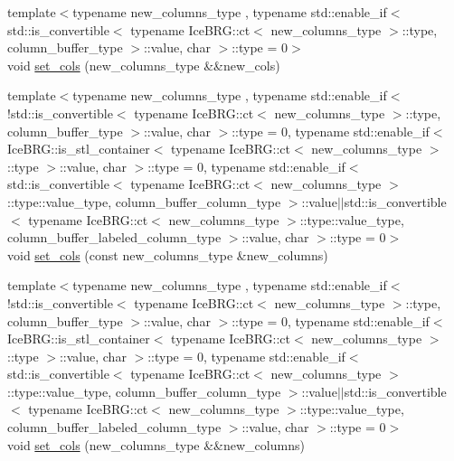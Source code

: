 \begin{DoxyCompactItemize}
{\footnotesize template$<$typename new\+\_\+columns\+\_\+type , typename std\+::enable\+\_\+if$<$ std\+::is\+\_\+convertible$<$ typename Ice\+B\+R\+G\+::ct$<$ new\+\_\+columns\+\_\+type $>$\+::type, column\+\_\+buffer\+\_\+type $>$\+::value, char $>$\+::type  = 0$>$ }\\void \hyperlink{classIceBRG_1_1labeled__array_af78a2d14599513072cffe0a4807bfc65}{set\+\_\+cols} (new\+\_\+columns\+\_\+type \&\&new\+\_\+cols)
\item 
{\footnotesize template$<$typename new\+\_\+columns\+\_\+type , typename std\+::enable\+\_\+if$<$!std\+::is\+\_\+convertible$<$ typename Ice\+B\+R\+G\+::ct$<$ new\+\_\+columns\+\_\+type $>$\+::type, column\+\_\+buffer\+\_\+type $>$\+::value, char $>$\+::type  = 0, typename std\+::enable\+\_\+if$<$ Ice\+B\+R\+G\+::is\+\_\+stl\+\_\+container$<$ typename Ice\+B\+R\+G\+::ct$<$ new\+\_\+columns\+\_\+type $>$\+::type $>$\+::value, char $>$\+::type  = 0, typename std\+::enable\+\_\+if$<$ std\+::is\+\_\+convertible$<$ typename Ice\+B\+R\+G\+::ct$<$ new\+\_\+columns\+\_\+type $>$\+::type\+::value\+\_\+type, column\+\_\+buffer\+\_\+column\+\_\+type $>$\+::value$\vert$$\vert$std\+::is\+\_\+convertible$<$ typename Ice\+B\+R\+G\+::ct$<$ new\+\_\+columns\+\_\+type $>$\+::type\+::value\+\_\+type, column\+\_\+buffer\+\_\+labeled\+\_\+column\+\_\+type $>$\+::value, char $>$\+::type  = 0$>$ }\\void \hyperlink{classIceBRG_1_1labeled__array_a1c548e3d14b657b1353b22c45661a9fd}{set\+\_\+cols} (const new\+\_\+columns\+\_\+type \&new\+\_\+columns)
\item 
{\footnotesize template$<$typename new\+\_\+columns\+\_\+type , typename std\+::enable\+\_\+if$<$!std\+::is\+\_\+convertible$<$ typename Ice\+B\+R\+G\+::ct$<$ new\+\_\+columns\+\_\+type $>$\+::type, column\+\_\+buffer\+\_\+type $>$\+::value, char $>$\+::type  = 0, typename std\+::enable\+\_\+if$<$ Ice\+B\+R\+G\+::is\+\_\+stl\+\_\+container$<$ typename Ice\+B\+R\+G\+::ct$<$ new\+\_\+columns\+\_\+type $>$\+::type $>$\+::value, char $>$\+::type  = 0, typename std\+::enable\+\_\+if$<$ std\+::is\+\_\+convertible$<$ typename Ice\+B\+R\+G\+::ct$<$ new\+\_\+columns\+\_\+type $>$\+::type\+::value\+\_\+type, column\+\_\+buffer\+\_\+column\+\_\+type $>$\+::value$\vert$$\vert$std\+::is\+\_\+convertible$<$ typename Ice\+B\+R\+G\+::ct$<$ new\+\_\+columns\+\_\+type $>$\+::type\+::value\+\_\+type, column\+\_\+buffer\+\_\+labeled\+\_\+column\+\_\+type $>$\+::value, char $>$\+::type  = 0$>$ }\\void \hyperlink{classIceBRG_1_1labeled__array_aa1c3f38fe019e4c3f6573533a7e0e6c1}{set\+\_\+cols} (new\+\_\+columns\+\_\+type \&\&new\+\_\+columns)

\end{DoxyCompactItemize}
